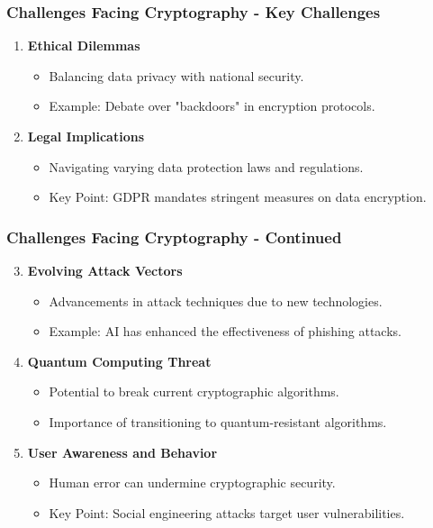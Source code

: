 \documentclass{beamer}
\begin{document}
\begin{frame}[fragile]
    \frametitle{Challenges Facing Cryptography - Key Challenges}
    \begin{enumerate}
        \item \textbf{Ethical Dilemmas}
        \begin{itemize}
            \item Balancing data privacy with national security.
            \item Example: Debate over "backdoors" in encryption protocols.
        \end{itemize}
        \item \textbf{Legal Implications}
        \begin{itemize}
            \item Navigating varying data protection laws and regulations.
            \item Key Point: GDPR mandates stringent measures on data encryption.
        \end{itemize}
    \end{enumerate}
\end{frame}

\begin{frame}[fragile]
    \frametitle{Challenges Facing Cryptography - Continued}
    \begin{enumerate}
        \setcounter{enumi}{2}
        \item \textbf{Evolving Attack Vectors}
        \begin{itemize}
            \item Advancements in attack techniques due to new technologies.
            \item Example: AI has enhanced the effectiveness of phishing attacks.
        \end{itemize}
        \item \textbf{Quantum Computing Threat}
        \begin{itemize}
            \item Potential to break current cryptographic algorithms.
            \item Importance of transitioning to quantum-resistant algorithms.
        \end{itemize}
        \item \textbf{User Awareness and Behavior}
        \begin{itemize}
            \item Human error can undermine cryptographic security.
            \item Key Point: Social engineering attacks target user vulnerabilities.
        \end{itemize}
    \end{enumerate}
\end{frame}
\end{document}
